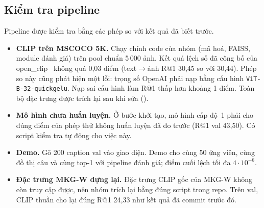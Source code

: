\subsection{Kiểm tra pipeline}
\label{sec:checks}

Pipeline được kiểm tra bằng các phép so với kết quả đã biết trước.
\begin{itemize}
\item \textbf{CLIP trên MSCOCO 5K.} Chạy chính code của nhóm (mã hoá, FAISS, module đánh giá) trên pool chuẩn 5\,000 ảnh.
Kết quả lệch số đã công bố của open\_clip~\cite{cherti2023openclip} không quá 0,03 điểm (text$\to$ảnh R@1 30,45 so với
30,44). Phép so này cũng phát hiện một lỗi: trọng số OpenAI phải nạp bằng cấu hình \texttt{ViT-B-32-quickgelu}. Nạp sai
cấu hình làm R@1 thấp hơn khoảng 1 điểm. Toàn bộ đặc trưng được trích lại sau khi sửa
().
\item \textbf{Mô hình chưa huấn luyện.} Ở bước khởi tạo, mô hình cấp độ~1 phải cho đúng điểm của phép thử không huấn luyện
đã đo trước (R@1 val 43,50). Có script kiểm tra tự động cho việc này.
\item \textbf{Demo.} Gõ 200 caption val vào giao diện. Demo cho cùng 50 ứng viên, cùng đồ thị câu và cùng top-1 với pipeline
đánh giá; điểm cuối lệch tối đa $4\cdot10^{-6}$.
\item \textbf{Đặc trưng MKG-W dựng lại.} Đặc trưng CLIP gốc của MKG-W không còn truy cập được, nên nhóm trích lại bằng đúng
script trong repo. Trên val, CLIP thuần cho lại đúng R@1 24,33 như kết quả đã commit trước đó.
\end{itemize}
